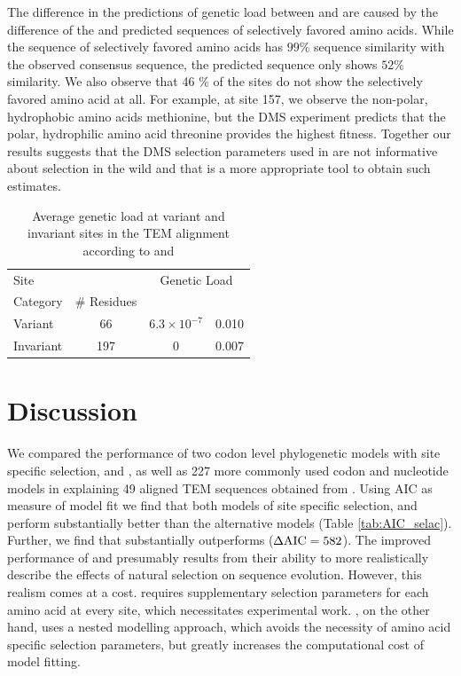 \documentclass[fleqn,letterpaper]{article}
\begin{document}
The difference in the predictions of genetic load between \selac and \phydms are caused by the difference of the \selac and \phydms predicted sequences of selectively favored amino acids.
While the \selac sequence of selectively favored amino acids has $99 \%$ sequence similarity with the observed consensus sequence, the \phydms predicted sequence only shows $52 \%$ similarity.
We also observe that 46 \% of the sites do not show the selectively favored amino acid at all.
For example, at site 157, we observe the non-polar, hydrophobic amino acids methionine, but the DMS experiment predicts that the polar, hydrophilic amino acid threonine provides the highest fitness.
Together our results suggests that the DMS selection parameters used in \phydms are not informative about selection in the wild and that \selac is a more appropriate tool to obtain such estimates.

\begin{table}
  \centering
  \caption{Average genetic load at variant and invariant sites in the TEM alignment according to \selac and \phydms}
  \begin{tabular}{lccc}
    \hline
	Site		& 		& \multicolumn{2}{c}{Genetic Load}  \\ 
    Category 		& \# Residues	& \multicolumn{1}{c}{\selac} & \multicolumn{1}{c}{\phydms} \\ \hline 
    Variant	&	66	& $6.3\times10^{-7}$ & 0.010  \\
    Invariant		& 	197	& 0 & 0.007 \\ \hline
  \end{tabular}
  \label{tab:selection}
\end{table}


\section{Discussion}
We compared the performance of two codon level phylogenetic models with site specific selection, \phydms and \selac, as well as 227 more commonly used codon and nucleotide models in explaining 49 aligned TEM sequences obtained from \citet{bloom2017}.
Using AIC as measure of model fit we find that both models of site specific selection, \phydms and \selac perform substantially better than the alternative models (Table \ref{tab:AIC_selac}).
Further, we find that \selac substantially outperforms \phydms ($\Delta\text{AIC} = 582$).
The improved performance of \phydms and \selac presumably results from their ability to more realistically describe the effects of natural selection on sequence evolution.
However, this realism comes at a cost. 
\phydms requires supplementary selection parameters for each amino acid at every site, which necessitates experimental work.
\selac, on the other hand, uses a nested modelling approach, which avoids the necessity of amino acid specific selection parameters, but greatly increases the computational cost of model fitting.
\end{document}
